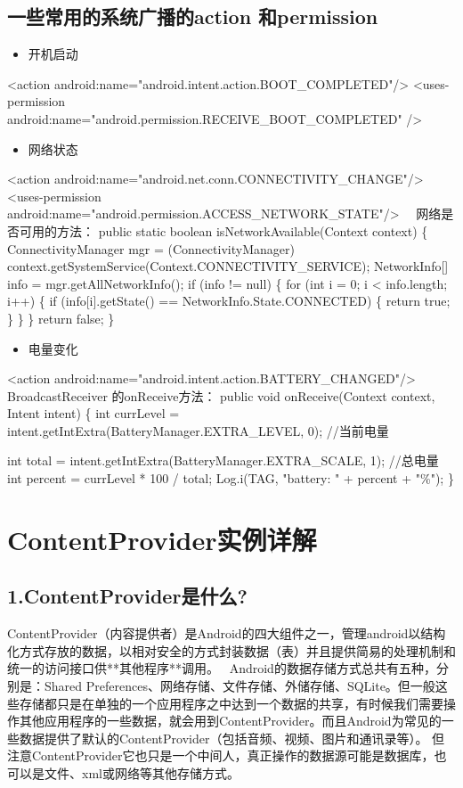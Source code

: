 \documentclass[9pt, b5paper]{article}
\begin{document}
\subsection{一些常用的系统广播的action 和permission}
\label{sec-13-6}
\begin{itemize}
\item 开机启动
\end{itemize}
<action android:name="android.intent.action.BOOT\_COMPLETED"/> 
<uses-permission android:name="android.permission.RECEIVE\_BOOT\_COMPLETED" />  
\begin{itemize}
\item 网络状态
\end{itemize}
<action android:name="android.net.conn.CONNECTIVITY\_CHANGE"/>  
<uses-permission android:name="android.permission.ACCESS\_NETWORK\_STATE"/> 
　网络是否可用的方法：
  public static boolean isNetworkAvailable(Context context) \{  
        ConnectivityManager mgr = (ConnectivityManager) context.getSystemService(Context.CONNECTIVITY\_SERVICE);  
        NetworkInfo[] info = mgr.getAllNetworkInfo();  
        if (info != null) \{  
            for (int i = 0; i < info.length; i++) \{  
      if (info[i].getState() == NetworkInfo.State.CONNECTED) \{  
                    return true;  
                \}  
            \}  
        \}  
        return false;  
    \} 
\begin{itemize}
\item 电量变化
\end{itemize}
<action android:name="android.intent.action.BATTERY\_CHANGED"/>  
BroadcastReceiver 的onReceive方法：
public void onReceive(Context context, Intent intent) \{  
        int currLevel = intent.getIntExtra(BatteryManager.EXTRA\_LEVEL, 0);  //当前电量  　

    int total = intent.getIntExtra(BatteryManager.EXTRA\_SCALE, 1);    //总电量  
    int percent = currLevel * 100 / total;  
    Log.i(TAG, "battery: " + percent + "\%");  
\}  
\section{ContentProvider实例详解}
\label{sec-14}
\subsection{1.ContentProvider是什么?}
\label{sec-14-1}
ContentProvider（内容提供者）是Android的四大组件之一，管理android以结构化方式存放的数据，以相对安全的方式封装数据（表）并且提供简易的处理机制和统一的访问接口供**其他程序**调用。　
Android的数据存储方式总共有五种，分别是：Shared Preferences、网络存储、文件存储、外储存储、SQLite。但一般这些存储都只是在单独的一个应用程序之中达到一个数据的共享，有时候我们需要操作其他应用程序的一些数据，就会用到ContentProvider。而且Android为常见的一些数据提供了默认的ContentProvider（包括音频、视频、图片和通讯录等）。
但注意ContentProvider它也只是一个中间人，真正操作的数据源可能是数据库，也可以是文件、xml或网络等其他存储方式。
\end{document}

